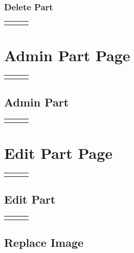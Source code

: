 \documentclass[12pt, letterpaper]{article}
\newcommand{\IPO}[3]{
  \begin{center}
    \begin{tabularx}{\linewidth}{XXX}
      \toprule
      \thead{Input} & \thead{Process} & \thead{Output} \\
      \midrule
      \RaggedRight{#1} & \RaggedRight{#2} & \RaggedRight{#3} \\
      \bottomrule
    \end{tabularx}
  \end{center}
}
\newcommand{\n}{\newline}
\begin{document}
\subsubsection{Delete Part}\label{deletepart}

\IPO{\begin{itemize}\item Part (\texttt{object})\item ``Delete'' button\end{itemize}}{Confirm if the admin wants to delete the part\n~\n\textbf{IF} admin confirms yes\n$\Rightarrow$ Delete part}{Refresh parts list}

\section{Admin Part Page}\label{partdetails}

\IPO{Part ``show'' button}{Render admin navigation bar (\ref{adminnavbar})\n Render admin part}{Admin part page}

\subsection{Admin Part}

\IPO{Part (\texttt{object})}{Render complete part ID, name, description, stock, image, and creation date\n~\n Render ``edit'' button that goes to its edit page (\ref{editpart})\n~\n Render ``delete button'' that deletes the part (\ref{deletepart})}{Part details}

\section{Edit Part Page}\label{editpart}

\IPO{Part ``edit'' button}{Render admin navigation bar (\ref{adminnavbar})\n Render edit form}{Edit part page}

\subsection{Edit Part}

\IPO{Part (\texttt{object})}{Render part name input (initial value: part's name)\n Render part description input (initial value: part's description)\n Render stock number input (initial value: part's stock, must be $\geq0$)\n Render current image with ``replace image'' button\n Render ``save'' button}{Edit form}

\subsection{Replace Image}
\end{document}
